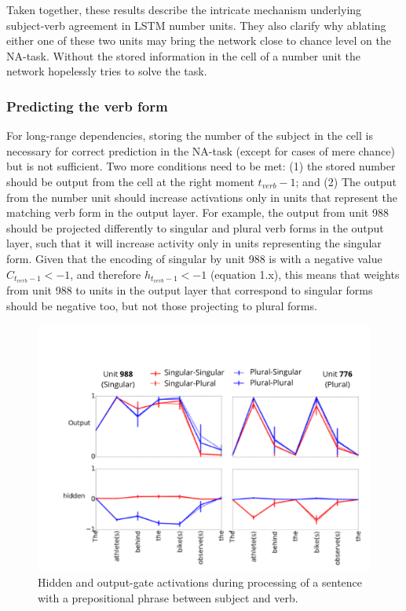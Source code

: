 Taken together, these results describe the intricate mechanism underlying subject-verb agreement in LSTM number units. They also clarify why ablating either one of these two units may bring the network close to chance level on the NA-task. Without the stored information in the cell of a number unit the network hopelessly tries to solve the task.


\subsubsection{Predicting the verb form}
For long-range dependencies, storing the number of the subject in the cell is necessary for correct prediction in the NA-task (except for cases of mere chance) but is not sufficient. Two more conditions need to be met: (1) the stored number should be output from the cell at the right moment $t_{verb}-1$; and (2) The output from the number unit should increase activations only in units that represent the matching verb form in the output layer. For example, the output from unit 988 should be projected differently to singular and plural verb forms in the output layer, such that it will increase activity only in units representing the singular form. Given that the encoding of singular by unit 988 is with a negative value $C_{t_{verb}-1}<-1$, and therefore $h_{t_{verb}-1}<-1$ (equation 1.x), this means that weights from unit 988 to units in the output layer that correspond to singular forms should be negative too, but not those projecting to plural forms.

\begin{figure}[ht]
\includegraphics[width=\textwidth]{Figures/Figure3_number_units_775_987_output_hidden.png}
\caption{Hidden and output-gate activations during processing of a sentence with a prepositional phrase between subject and verb. }
\end{figure}

